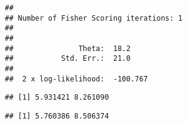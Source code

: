 \begin{solution}{6.4}
\begin{enumerate}
\begin{knitrout}
\begin{kframe}
\begin{verbatim}
##
## Number of Fisher Scoring iterations: 1
##
##
##               Theta:  18.2
##           Std. Err.:  21.0
##
##  2 x log-likelihood:  -100.767
\end{verbatim}
\begin{alltt}
\hlopt{$}\hlstd{coef[}\hlstd{]}\hlopt{+}\hlstd{(}\hlopt{-}\hlstd{,}\hlstd{)}\hlopt{*}\hlstd{(}\hlstd{)}\hlopt{*}\hlopt{$}\hlstd{coefficients[}\hlstd{,}\hlstd{])}
\end{alltt}
\begin{verbatim}
## [1] 5.931421 8.261090
\end{verbatim}
\begin{alltt}
\hlopt{$}\hlstd{coef[}\hlstd{]}\hlopt{+}\hlstd{(}\hlopt{-}\hlstd{,}\hlstd{)}\hlopt{*}\hlstd{(}\hlstd{)}\hlopt{*}\hlopt{$}\hlstd{coefficients[}\hlstd{,}\hlstd{])}
\end{alltt}
\begin{verbatim}
## [1] 5.760386 8.506374
\end{verbatim}
\end{kframe}
\end{knitrout}

\end{enumerate}
\end{solution}
